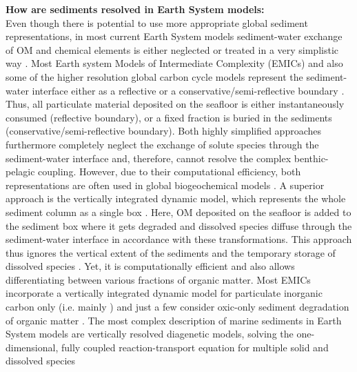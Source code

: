 \documentclass[gmd, manuscript]{copernicus}
\begin{document}
\textbf{How are sediments resolved in Earth System models:}\\
Even though there is potential to use more appropriate global sediment representations, in most current Earth System models sediment-water exchange of OM and chemical elements is either neglected or treated in a very 
simplistic way \citep{soetaert_coupling_2000, huelse_biopump_models_2016}. 
Most Earth system Models of Intermediate Complexity (EMICs) and also some of the higher resolution global carbon cycle models represent the sediment-water interface either as a reflective or a conservative/semi-reflective boundary 
\citep{huelse_biopump_models_2016}. 
Thus, all particulate material deposited on the seafloor is either instantaneously consumed (reflective boundary), or a fixed fraction is buried in the sediments (conservative/semi-reflective boundary). 
Both highly simplified approaches furthermore completely neglect the exchange of solute species through the sediment-water interface and, therefore, cannot resolve the complex benthic-pelagic coupling. 
However, due to their computational efficiency, both representations are often used in global biogeochemical models \citep[e.g.][]{najjar_impact_2007, ridgwell_marine_2007, goosse_description_2010}. 
A superior approach is the vertically integrated dynamic model, which represents the whole sediment column as a single box \citep{huelse_biopump_models_2016}. Here, OM deposited on the seafloor is added 
to the sediment box where it gets degraded and dissolved species diffuse through the sediment-water interface in accordance with these transformations. 
This approach thus ignores the vertical extent of the sediments and the temporary storage of dissolved species \citep{soetaert_coupling_2000}. Yet, it is computationally efficient and 
also allows differentiating between various fractions of organic matter. Most EMICs incorporate a vertically integrated dynamic model for particulate inorganic carbon only (i.e. mainly ) and just a few  
consider oxic-only sediment degradation of organic matter \citep{huelse_biopump_models_2016}. 
The most complex description of marine sediments in Earth System models are vertically resolved diagenetic models, solving the one-dimensional, fully coupled reaction-transport equation for multiple solid and dissolved species 
\end{document}
